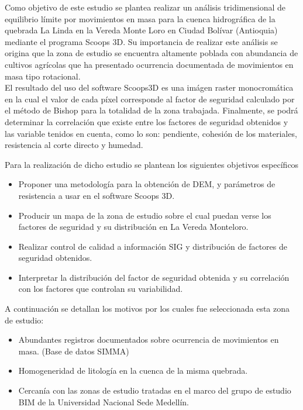 Como objetivo de este estudio se plantea realizar un an\'alisis tridimensional de equilibrio l\'imite por movimientos en masa para la cuenca hidrogr\'afica de la quebrada La Linda en la Vereda Monte Loro en Ciudad Bol\'ivar (Antioquia) mediante el programa Scoops 3D.
Su importancia de realizar este an\'alisis se origina que la zona de estudio se encuentra altamente poblada \cite{sgc2013} con abundancia de cultivos agr\'icolas que ha presentado ocurrencia documentada de movimientos en masa tipo rotacional.\\

El resultado del uso del software Scoops3D es una im\'agen raster monocrom\'atica en la cual el valor de cada p\'ixel corresponde al factor de seguridad calculado por el m\'etodo de Bishop para la totalidad de la zona trabajada. Finalmente, se podr\'a determinar la  correlaci\'on que existe entre los factores de seguridad obtenidos y las variable tenidos en cuenta, como lo son: pendiente, cohesi\'on de los materiales, resistencia al corte directo y humedad.

Para la realizaci\'on de dicho estudio se plantean los siguientes objetivos espec\'ificos 

\begin{itemize}
\item Proponer una metodolog\'ia para la obtenci\'on de DEM, y par\'ametros de resistencia a usar en el software Scoops 3D.
\item Producir un mapa de la zona de estudio sobre el cual puedan verse los factores de seguridad y su distribuci\'on en La Vereda Monteloro.
\item Realizar control de calidad a informaci\'on SIG y distribuci\'on de factores de seguridad obtenidos.
\item Interpretar la distribuci\'on del factor de seguridad obtenida y su correlaci\'on con los factores que controlan su variabilidad.


\end{itemize} 

A continuaci\'on se detallan los motivos por los cuales fue seleccionada esta zona de estudio:

\begin{itemize}
\item Abundantes registros documentados sobre ocurrencia de movimientos en masa. (Base de datos SIMMA)
\item Homogeneridad de litolog\'ia en la cuenca de la misma quebrada.
\item Cercan\'ia con las zonas de estudio tratadas en el marco del grupo de estudio BIM de la Universidad Nacional Sede Medell\'in.
\end{itemize}

